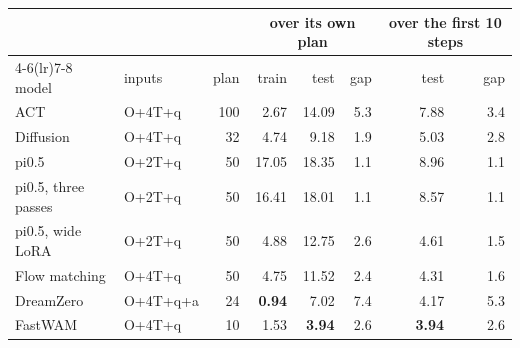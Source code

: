 \begin{tabular}{llrrrrrr}
\toprule
& & & \multicolumn{3}{c}{over its own plan} & \multicolumn{2}{c}{over the first 10 steps} \\
\cmidrule(lr){4-6}\cmidrule(lr){7-8}
model & inputs & plan & train & test & gap & test & gap \\
\midrule
ACT & O+4T+q & 100 & 2.67 & 14.09 & 5.3 & 7.88 & 3.4 \\
Diffusion & O+4T+q & 32 & 4.74 & 9.18 & 1.9 & 5.03 & 2.8 \\
pi0.5 & O+2T+q & 50 & 17.05 & 18.35 & 1.1 & 8.96 & 1.1 \\
pi0.5, three passes & O+2T+q & 50 & 16.41 & 18.01 & 1.1 & 8.57 & 1.1 \\
pi0.5, wide LoRA & O+2T+q & 50 & 4.88 & 12.75 & 2.6 & 4.61 & 1.5 \\
Flow matching & O+4T+q & 50 & 4.75 & 11.52 & 2.4 & 4.31 & 1.6 \\
DreamZero & O+4T+q+a & 24 & \textbf{0.94} & 7.02 & 7.4 & 4.17 & 5.3 \\
FastWAM & O+4T+q & 10 & 1.53 & \textbf{3.94} & 2.6 & \textbf{3.94} & 2.6 \\
\bottomrule
\end{tabular}
